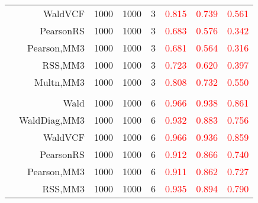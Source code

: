 \documentclass[
]{article}
\begin{document}
\begin{table}[H]
{\begin{tabular}[t]{lrrrrrrr}
\hspace{1em} & WaldVCF & 1000 & 1000 & 3 & \textcolor{red}{0.815} & \textcolor{red}{0.739} & \textcolor{red}{0.561}\\

\hspace{1em} & PearsonRS & 1000 & 1000 & 3 & \textcolor{red}{0.683} & \textcolor{red}{0.576} & \textcolor{red}{0.342}\\

\hspace{1em} & Pearson,MM3 & 1000 & 1000 & 3 & \textcolor{red}{0.681} & \textcolor{red}{0.564} & \textcolor{red}{0.316}\\

\hspace{1em} & RSS,MM3 & 1000 & 1000 & 3 & \textcolor{red}{0.723} & \textcolor{red}{0.620} & \textcolor{red}{0.397}\\

\hspace{1em} & Multn,MM3 & 1000 & 1000 & 3 & \textcolor{red}{0.808} & \textcolor{red}{0.732} & \textcolor{red}{0.550}\\
\cmidrule{1-8}
\addlinespace[0.3em]
\multicolumn{8}{l}{\textbf{1F 15V}}\\
\hspace{1em} & Wald & 1000 & 1000 & 6 & \textcolor{red}{0.966} & \textcolor{red}{0.938} & \textcolor{red}{0.861}\\

\hspace{1em} & WaldDiag,MM3 & 1000 & 1000 & 6 & \textcolor{red}{0.932} & \textcolor{red}{0.883} & \textcolor{red}{0.756}\\

\hspace{1em} & WaldVCF & 1000 & 1000 & 6 & \textcolor{red}{0.966} & \textcolor{red}{0.936} & \textcolor{red}{0.859}\\

\hspace{1em} & PearsonRS & 1000 & 1000 & 6 & \textcolor{red}{0.912} & \textcolor{red}{0.866} & \textcolor{red}{0.740}\\

\hspace{1em} & Pearson,MM3 & 1000 & 1000 & 6 & \textcolor{red}{0.911} & \textcolor{red}{0.862} & \textcolor{red}{0.727}\\

\hspace{1em} & RSS,MM3 & 1000 & 1000 & 6 & \textcolor{red}{0.935} & \textcolor{red}{0.894} & \textcolor{red}{0.790}\\


\end{tabular}}
\end{table}
\end{document}
